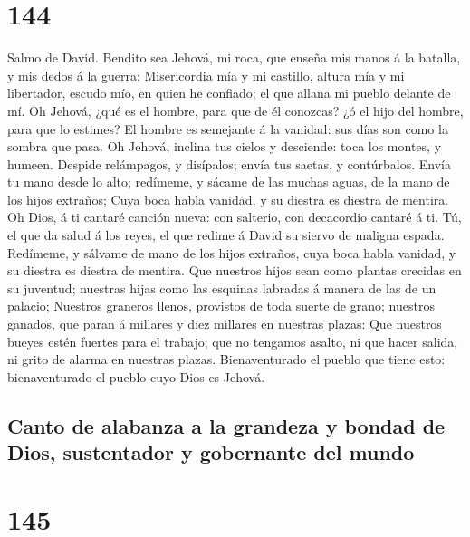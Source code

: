 \hypertarget{section-143}{%
\section{144}\label{section-143}}

 Salmo de David. Bendito sea Jehová, mi roca, que enseña
mis manos á la batalla, y mis dedos á la guerra: 
Misericordia mía y mi castillo, altura mía y mi libertador, escudo mío,
en quien he confiado; el que allana mi pueblo delante de mí.
 Oh Jehová, ¿qué es el hombre, para que de él conozcas? ¿ó
el hijo del hombre, para que lo estimes?  El hombre es
semejante á la vanidad: sus días son como la sombra que pasa.
 Oh Jehová, inclina tus cielos y desciende: toca los
montes, y humeen.  Despide relámpagos, y disípalos; envía
tus saetas, y contúrbalos.  Envía tu mano desde lo alto;
redímeme, y sácame de las muchas aguas, de la mano de los hijos
extraños;  Cuya boca habla vanidad, y su diestra es
diestra de mentira.  Oh Dios, á ti cantaré canción nueva:
con salterio, con decacordio cantaré á ti.  Tú, el que da
salud á los reyes, el que redime á David su siervo de maligna espada.
 Redímeme, y sálvame de mano de los hijos extraños, cuya
boca habla vanidad, y su diestra es diestra de mentira. 
Que nuestros hijos sean como plantas crecidas en su juventud; nuestras
hijas como las esquinas labradas á manera de las de un palacio;
 Nuestros graneros llenos, provistos de toda suerte de
grano; nuestros ganados, que paran á millares y diez millares en
nuestras plazas:  Que nuestros bueyes estén fuertes para
el trabajo; que no tengamos asalto, ni que hacer salida, ni grito de
alarma en nuestras plazas.  Bienaventurado el pueblo que
tiene esto: bienaventurado el pueblo cuyo Dios es Jehová.

\hypertarget{canto-de-alabanza-a-la-grandeza-y-bondad-de-dios-sustentador-y-gobernante-del-mundo}{%
\subsection{Canto de alabanza a la grandeza y bondad de Dios,
sustentador y gobernante del
mundo}\label{canto-de-alabanza-a-la-grandeza-y-bondad-de-dios-sustentador-y-gobernante-del-mundo}}

\hypertarget{section-144}{%
\section{145}\label{section-144}}

